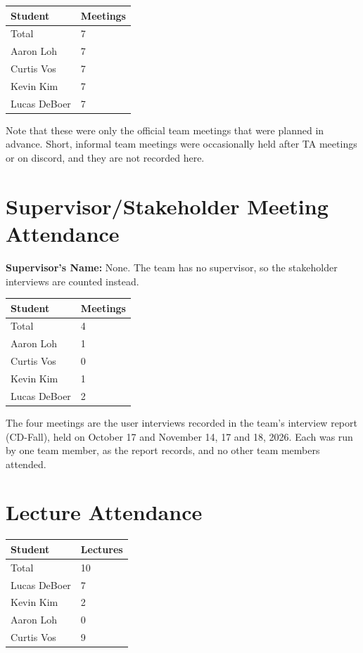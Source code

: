 \documentclass{article}
\begin{document}
\begin{table}[H]
\centering
\begin{tabular}{ll}
\toprule
\textbf{Student} & \textbf{Meetings}\\
\midrule
Total & 7\\
Aaron Loh & 7\\
Curtis Vos & 7\\
Kevin Kim & 7\\
Lucas DeBoer & 7\\
\bottomrule
\end{tabular}
\end{table}

Note that these were only the official team meetings that were planned in advance. Short, informal 
team meetings were occasionally held after TA meetings or on discord, and they are not recorded here.

\section{Supervisor/Stakeholder Meeting Attendance}

\noindent \textbf{Supervisor's Name: } None. The team has no supervisor, so the
stakeholder interviews are counted instead.

\begin{table}[H]
\centering
\begin{tabular}{ll}
\toprule
\textbf{Student} & \textbf{Meetings}\\
\midrule
Total & 4\\
Aaron Loh & 1\\
Curtis Vos & 0\\
Kevin Kim & 1\\
Lucas DeBoer & 2\\
\bottomrule
\end{tabular}
\end{table}

The four meetings are the user interviews recorded in the team's interview
report (CD-Fall), held on October 17 and November 14, 17 and 18, 2026. Each was
run by one team member, as the report records, and no other team members
attended.

\section{Lecture Attendance}

\begin{table}[H]
\centering
\begin{tabular}{ll}
\toprule
\textbf{Student} & \textbf{Lectures}\\
\midrule
Total & 10\\
Lucas DeBoer & 7\\
Kevin Kim & 2\\
Aaron Loh & 0\\
Curtis Vos & 9\\
\bottomrule
\end{tabular}
\end{table}
\end{document}

